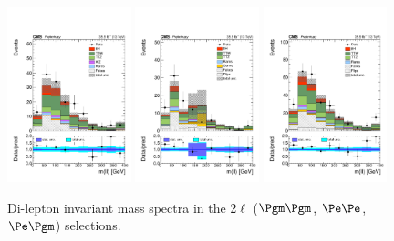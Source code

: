 \begin{figure}[htb]
	\centering 
\includegraphics[width=0.32\textwidth]{plots_leptons/lep_evtsel/2lss_SR/mm/2lep_mll.pdf}
\includegraphics[width=0.32\textwidth]{plots_leptons/lep_evtsel/2lss_SR/ee/2lep_mll.pdf}
\includegraphics[width=0.32\textwidth]{plots_leptons/lep_evtsel/2lss_SR/em/2lep_mll.pdf}
	\caption{Di-lepton invariant mass spectra in the 2$\ell$ ($\Pgm\Pgm$, $\Pe\Pe$, $\Pe\Pgm$) selections.}
	\label{fig:2l_mll}
\end{figure}

